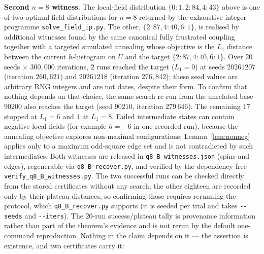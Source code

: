 \documentclass[12pt]{article}
\begin{document}
\noindent\textbf{Second $n=8$ witness.}
The local-field distribution $\{0{:}1,2{:}84,4{:}43\}$ above is one
of two optimal field distributions for $n=8$ returned by the exhaustive
integer programme \texttt{solve\_field\_ip.py}. The other,
$\{2{:}87,4{:}40,6{:}1\}$, is realised by additional witnesses found
by the same canonical fully frustrated coupling together with a targeted
simulated annealing whose objective is the $L_1$ distance between the
current $h$-histogram on $U$ and the target $\{2{:}87,4{:}40,6{:}1\}$.
Over $20$ seeds $\times$ $300{,}000$ iterations, $2$ runs reached the
target ($L_1=0$) at seeds $20261207$ (iteration $260{,}621$) and
$20261218$ (iteration $276{,}842$); these seed values are arbitrary RNG
integers and are not dates, despite their form. To confirm that nothing
depends on that choice, the same search re-run from the unrelated base $90200$
also reaches the target (seed $90210$, iteration $279\,646$). The remaining
$17$ stopped at $L_1=6$ and $1$ at $L_1=8$. Failed intermediate states can contain negative local fields (for
example $h=-6$ in one recorded run), because the annealing objective explores
non-maximal configurations; Lemma~\ref{lem:nonneg} applies only to a maximum
odd-square edge set and is not contradicted by such intermediates. Both
witnesses are released in
\texttt{q8\_B\_witnesses.json} (spins and edges), regenerable via
\texttt{q8\_B\_recover.py}, and verified by the dependency-free
\texttt{verify\_q8\_B\_witnesses.py}. The two successful runs can be checked directly from the stored certificates
without any search; the other eighteen are recorded only by their plateau
distances, so confirming those requires rerunning the protocol, which
\texttt{q8\_B\_recover.py} supports (it is seeded per trial and takes
\texttt{-{}-seeds} and \texttt{-{}-iters}). The 20-run success/plateau tally is provenance information rather than part
of the theorem's evidence and is not rerun by the default one-command
reproduction. Nothing in the claim depends on it --- the assertion is
existence, and two certificates carry it:
\end{document}
